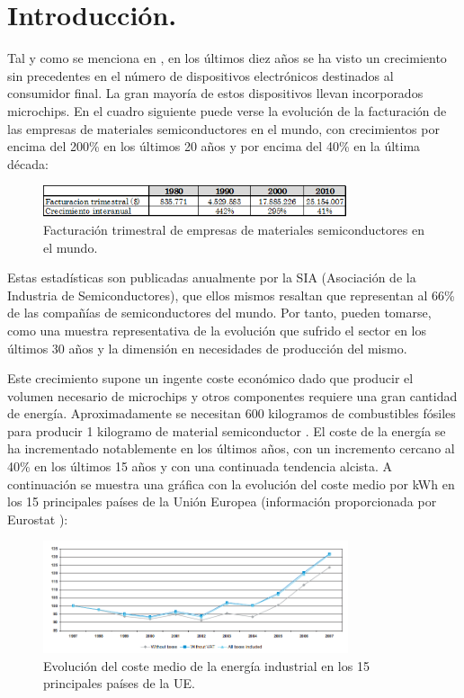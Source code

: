 \section{Introducción.}

Tal y como se menciona en \cite{reusing-silicon}, en los últimos diez años se ha visto un crecimiento sin 
precedentes en el número de dispositivos electrónicos destinados al consumidor final. La gran mayoría de estos dispositivos llevan incorporados microchips. En el cuadro siguiente puede verse la evolución de la facturación de las empresas de materiales semiconductores en el mundo, con crecimientos por encima del 200\% en los últimos 20 años y por encima del 40\% en la última década:

\begin{figure}[H]
\begin{center}
\includegraphics[width=0.8\textwidth]{img/estadisticas_chips}
\caption{Facturación trimestral de empresas de materiales semiconductores en el mundo.}
\end{center}
\end{figure}

Estas estadísticas son publicadas anualmente por la SIA \cite{SIA} (Asociación de la Industria de Semiconductores), que ellos mismos resaltan que representan al 66\% de las compañías de semiconductores del mundo. Por tanto, pueden tomarse, como una muestra representativa de la evolución que sufrido el sector en los últimos 30 años y la dimensión en necesidades de producción del mismo.

Este crecimiento supone un ingente coste económico dado que producir el volumen necesario de microchips y otros componentes requiere una gran cantidad de energía. Aproximadamente se necesitan 600 kilogramos de combustibles fósiles para producir 1 kilogramo de material semiconductor \cite{reusing-silicon}. El coste de la energía se ha incrementado notablemente en los últimos años, con un incremento cercano al 40\% en los últimos 15 años y con una continuada tendencia alcista. A continuación se muestra una gráfica con la evolución del coste medio por kWh en los 15 principales países de la Unión Europea (información proporcionada por Eurostat \cite{eurostat1}):

\begin{figure}[H]
\begin{center}
\includegraphics[width=0.8\textwidth]{img/precio_electricidad_industrial}
\caption{Evolución del coste medio de la energía industrial en los 15 principales países de la UE.}
\end{center}
\end{figure}

